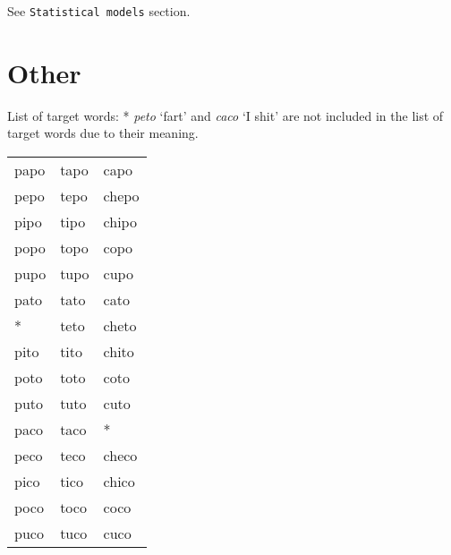 \documentclass[11pt,]{article}
\begin{document}
See \texttt{Statistical\ models} section.

\hypertarget{other}{%
\section{Other}\label{other}}

List of target words: * \emph{peto} `fart' and \emph{caco} `I shit' are
not included in the list of target words due to their meaning.

\begin{tabular}{lll}
papo & tapo & capo  \\
pepo & tepo & chepo \\
pipo & tipo & chipo \\
popo & topo & copo  \\
pupo & tupo & cupo  \\
pato & tato & cato  \\
*    & teto & cheto \\
pito & tito & chito \\
poto & toto & coto  \\
puto & tuto & cuto  \\
paco & taco & *     \\
peco & teco & checo \\
pico & tico & chico \\
poco & toco & coco  \\
puco & tuco & cuco
\end{tabular}


\end{document}
